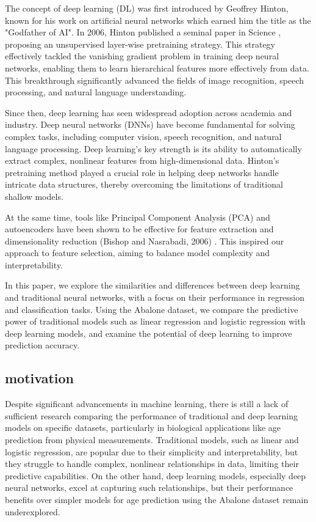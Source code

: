 \documentclass[conference]{IEEEtran}
\begin{document}
The concept of deep learning (DL) was first introduced by Geoffrey
Hinton, known for his work on artificial neural networks which earned him the title as the "Godfather of AI". In 2006, Hinton published a seminal paper in Science \cite{hinton2006reducing}, proposing an unsupervised layer-wise pretraining strategy. This strategy effectively tackled the vanishing gradient problem in training deep neural networks, enabling them to learn hierarchical features more effectively from data. This breakthrough significantly advanced the fields of image recognition, speech processing, and natural language understanding.

Since then, deep learning has seen widespread adoption across academia and industry. Deep neural networks (DNNs) have become fundamental for solving complex tasks, including computer vision, speech recognition, and natural language processing. Deep learning's key strength is its ability to automatically extract complex, nonlinear features from high-dimensional data. Hinton's pretraining method played a crucial role in helping deep networks handle intricate data structures, thereby overcoming the limitations of traditional shallow models.

At the same time, tools like Principal Component Analysis (PCA) and autoencoders have been shown to be effective for feature extraction and dimensionality reduction (Bishop and Nasrabadi, 2006) \cite{bishop2006pattern}. This inspired our approach to feature selection, aiming to balance model complexity and interpretability.


In this paper, we explore the similarities and differences between deep learning
and traditional neural networks, with a focus on their performance in
regression and classification tasks. Using the Abalone dataset, we compare the predictive power of
traditional models such as\textbf{ }linear
regression\textbf{ }and\textbf{ }logistic regression\textbf{ }with deep learning models, and examine the potential of
deep learning to improve prediction accuracy.

\subsection{motivation}

Despite significant advancements in machine learning, there is still a lack of sufficient research comparing the performance of traditional and deep learning models on specific datasets, particularly in biological applications like age prediction from physical measurements. Traditional models, such as linear and logistic regression, are popular due to their simplicity and interpretability, but they struggle to handle complex, nonlinear relationships in data, limiting their predictive capabilities. On the other hand, deep learning models, especially deep neural networks, excel at capturing such relationships, but their performance benefits over simpler models for age prediction using the Abalone dataset remain underexplored.
\end{document}
